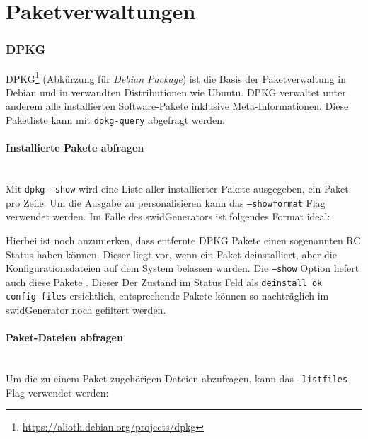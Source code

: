\section{Paketverwaltungen}


\subsubsection{DPKG}

DPKG\footnote{\url{https://alioth.debian.org/projects/dpkg}} (Abkürzung für
\textit{Debian Package}) ist die Basis der Paketverwaltung in Debian und in
verwandten Distributionen wie Ubuntu. DPKG verwaltet unter anderem alle
installierten Software-Pakete inklusive Meta-Informationen. Diese Paketliste
kann mit \texttt{dpkg-query} abgefragt werden.

\paragraph{Installierte Pakete abfragen} \hspace{0pt} \\

\noindent Mit \texttt{dpkg ---show} wird eine Liste aller installierter Pakete
ausgegeben, ein Paket pro Zeile. Um die Ausgabe zu personalisieren kann das
\texttt{---showformat} Flag verwendet werden. Im Falle des swidGenerators
ist folgendes Format ideal:


\noindent Hierbei ist noch anzumerken, dass entfernte DPKG Pakete einen sogenannten RC Status haben können. Dieser liegt vor, wenn ein Paket deinstalliert, aber die Konfigurationsdateien auf dem System belassen wurden. Die \texttt{---show} Option liefert auch diese Pakete . Dieser Der Zustand im Status Feld als \texttt{deinstall ok config-files} ersichtlich, entsprechende Pakete können so nachträglich im swidGenerator noch gefiltert werden.
\paragraph{Paket-Dateien abfragen} \hspace{0pt} \\

\noindent Um die zu einem Paket zugehörigen Dateien abzufragen, kann das
\texttt{---listfiles} Flag verwendet werden:

